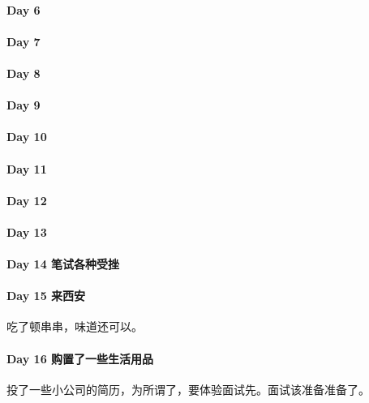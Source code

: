 \documentclass[UTF8,a4paper,8pt]{ctexart}
\begin{document}
 	 \paragraph{Day 6       \quad     }
 	 \paragraph{Day 7       \quad     }
 	 \paragraph{Day 8       \quad     }
 	 \paragraph{Day 9       \quad     }
 	 \paragraph{Day 10      \quad     }
 	 \paragraph{Day 11      \quad     }
 	 \paragraph{Day 12      \quad     }
 	 \paragraph{Day 13      \quad     }
 	 \paragraph{Day 14   笔试各种受挫   \quad     }
 	 \paragraph{Day 15   来西安   \quad     }
	 	 吃了顿串串，味道还可以。
	 	 
 	 \paragraph{Day 16   购置了一些生活用品   \quad     }
	 	 投了一些小公司的简历，为所谓了，要体验面试先。面试该准备准备了。
	 	 
\end{document}
